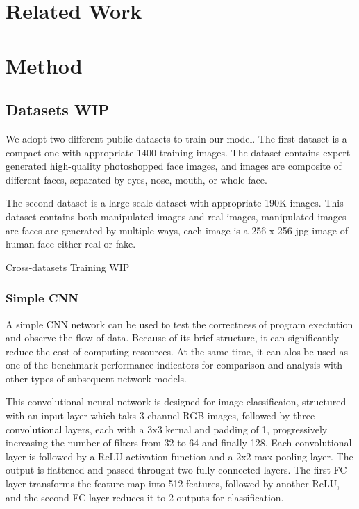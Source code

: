 \documentclass[final]{cvpr}
\begin{document}
\section{Related Work}

\section{Method}
\subsection{Datasets WIP}
We adopt two different public datasets to train our model. The first dataset is a compact one with appropriate 1400 training images. The dataset contains expert-generated high-quality photoshopped face images, and images are composite of different faces, separated by eyes, nose, mouth, or whole face\cite{kaggledatasetRealAndFakeFaceDetection}.

The second dataset is a large-scale dataset with appropriate 190K images. This dataset contains both manipulated images and real images, manipulated images are faces are generated by multiple ways, each image is a 256 x 256 jpg image of human face either real or fake\cite{kaggledatadeepfakeandrealimages, le2021openforensics}.

Cross-datasets Training WIP

\subsubsection{Simple CNN}

A simple CNN network can be used to test the correctness of program exectution and observe the flow of data. Because of its brief structure, it can significantly reduce the cost of computing resources. At the same time, it can alos be used as one of the benchmark performance indicators for comparison and analysis with other types of subsequent network models.

This convolutional neural network is designed for image classificaion, structured with an input layer which taks 3-channel RGB images, followed by three convolutional layers, each with a 3x3 kernal and padding of 1, progressively increasing the number of filters from 32 to 64 and finally 128. Each convolutional layer is followed by a ReLU activation function and a 2x2 max pooling layer. The output is flattened and passed throught two fully connected layers. The first FC layer transforms the feature map into 512 features, followed by another ReLU, and the second FC layer reduces it to 2 outputs for classification. 
\end{document}
